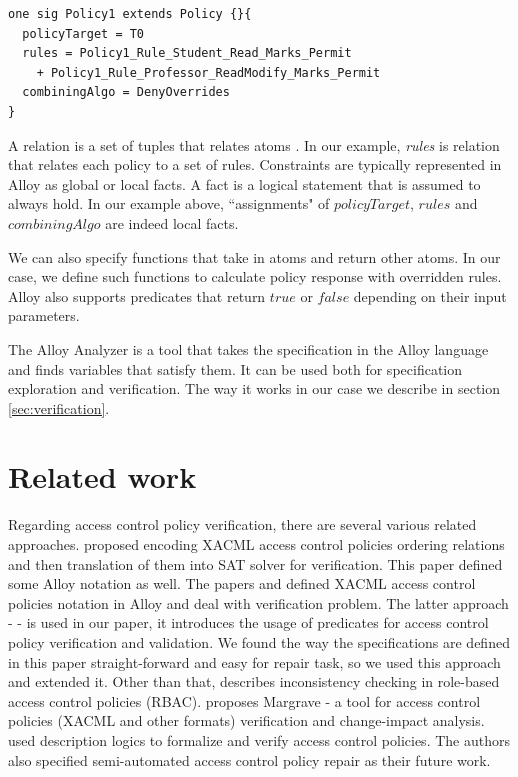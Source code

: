 \documentclass{acm_proc_article-sp}
\begin{document}
\begin{verbatim}
one sig Policy1 extends Policy {}{
  policyTarget = T0
  rules = Policy1_Rule_Student_Read_Marks_Permit 
    + Policy1_Rule_Professor_ReadModify_Marks_Permit
  combiningAlgo = DenyOverrides
}
\end{verbatim}

A relation is a set of tuples that relates atoms \cite{jackson:alloy}. In our example, \textit{rules} is relation that relates each policy to a set of rules. Constraints are typically represented in Alloy as global or local facts. A fact is a logical statement that is assumed to always hold. In our example above, ``assignments" of $policyTarget$, $rules$ and $combiningAlgo$ are indeed local facts.

We can also specify functions that take in atoms and return other atoms. In our case, we define such functions to calculate policy response with overridden rules. Alloy also supports predicates that return $true$ or $false$ depending on their input parameters.

The Alloy Analyzer is a tool that takes the specification in the Alloy language and finds variables that satisfy them. It can be used both for specification exploration and verification. The way it works in our case we describe in section \ref{sec:verification}.

\section{Related work}

Regarding access control policy verification, there are several various related approaches.
\cite{Hughes:2008:AVA:1459278.1459282} proposed encoding XACML access control policies  ordering relations and then translation of them into SAT solver for verification. This paper defined some Alloy notation as well.  The papers \cite{acp:automated} and \cite{acp:alloy} defined XACML access control policies notation in Alloy and deal with verification problem. The latter approach - \cite{acp:alloy} - is used in our paper, it introduces the usage of predicates for access control policy verification and validation. We found the way the specifications are defined in this paper straight-forward and easy for repair task, so we used this approach and extended it. Other than that, \cite{4258517} describes inconsistency checking in role-based access control policies (RBAC). \cite{Fisler:2005:VCA:1062455.1062502} proposes Margrave - a tool for access control policies (XACML and other formats) verification and change-impact analysis. \cite {acp:descriptionlogics} used description logics to formalize and verify access control policies. The authors also specified semi-automated access control policy repair as their future work.
\end{document}
